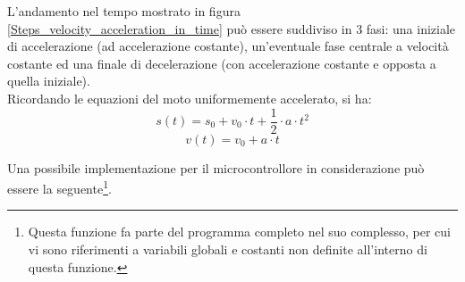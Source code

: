 \documentclass[12pt]{article}
\begin{document}
        
        L'andamento nel tempo mostrato in figura \ref{Steps_velocity_acceleration_in_time} può essere suddiviso in 3 fasi: una iniziale di accelerazione (ad accelerazione costante), un'eventuale fase centrale a velocità costante ed una finale di decelerazione (con accelerazione costante e opposta a quella iniziale).\\
        
        Ricordando le equazioni del moto uniformemente accelerato, si ha:
        \begin{equation}
            s(t) = s_0 + v_0 \cdot t + \frac{1}{2} \cdot a \cdot t^2
        \end{equation}
        \begin{equation}
            v(t) = v_0 + a \cdot t
        \end{equation}       
        

        \vspace{0.1cm}

        Una possibile implementazione per il microcontrollore in considerazione può essere la seguente\footnote{Questa funzione fa parte del programma completo nel suo complesso, per cui vi sono riferimenti a variabili globali e costanti non definite all'interno di questa funzione.}.
        
\end{document}

